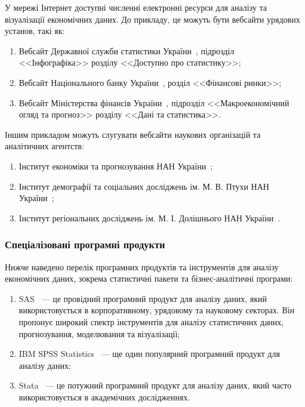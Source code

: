 У мережі Інтернет доступні численні електронні ресурси для аналізу та візуалізації економічних даних. До прикладу, це можуть бути вебсайти урядових установ, такі як:
\begin{enumerate}
    \item Вебсайт Державної служби статистики України~\cite{ukrstat}, підрозділ <<Інфографіка>> розділу <<Доступно про статистику>>;
    \item Вебсайт Національного банку України~\cite{bankgov}, розділ <<Фінансові ринки>>;
    \item Вебсайт Міністерства фінансів України~\cite{mofgov}, підрозділ <<Макроекономічний огляд та прогноз>> розділу <<Дані та статистика>>.
\end{enumerate}

Іншим прикладом можуть слугувати вебсайти наукових організацій та аналітичних агентств:
\begin{enumerate}
    \item Інститут економіки та прогнозування НАН України~\cite{ieforg};
    \item Інститут демографії та соціальних досліджень ім. М. В. Птухи НАН України~\cite{idssorg};
    \item Інститут регіональних досліджень ім. М. І. Долішнього НАН України~\cite{irdgov}.
\end{enumerate}

\subsubsection*{Спеціалізовані програмні продукти}

Нижче наведено перелік програмних продуктів та інструментів для аналізу економічних даних, зокрема статистичні пакети та бізнес-аналітичні програми:
\begin{enumerate}
    \item SAS~\cite{sascom} --- це провідний програмний продукт для аналізу даних, який використовується в корпоративному, урядовому та науковому секторах. Він пропонує широкий спектр інструментів для аналізу статистичних даних, прогнозування, моделювання та візуалізації;
    \item IBM SPSS Statistics~\cite{spssstatistics} --- ще один популярний програмний продукт для аналізу даних;
    \item Stata~\cite{stata} --- це потужний програмний продукт для аналізу даних, який часто використовується в академічних дослідженнях.
\end{enumerate}

